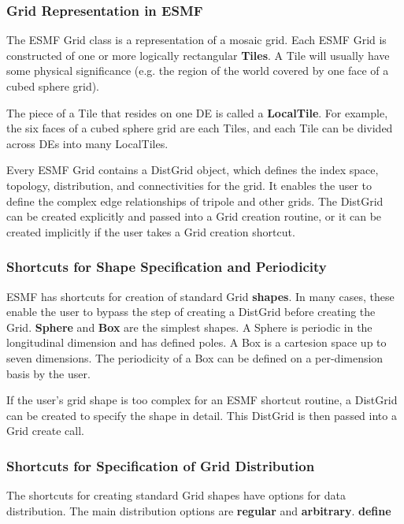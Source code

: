 \subsubsection{Grid Representation in ESMF}

The ESMF Grid class is a representation of a mosaic grid.  Each ESMF
Grid is constructed of one or more logically rectangular {\bf Tiles}.
A Tile will usually have some physical significance (e.g. the region
of the world covered by one face of a cubed sphere grid).

The piece of a Tile that resides on one DE is called a {\bf LocalTile}.
For example, the six faces of a cubed sphere grid are each Tiles, and
each Tile can be divided across DEs into many LocalTiles. 

Every ESMF Grid contains a DistGrid object, which defines the index space,
topology, distribution, and connectivities for the grid.  It enables
the user to define the complex edge relationships of tripole and other
grids.  The DistGrid can be created explicitly and passed into a Grid
creation routine, or it can be created implicitly if the user takes
a Grid creation shortcut.

\subsubsection{Shortcuts for Shape Specification and Periodicity}
\label{sec:ShapeShortcut}
ESMF has shortcuts for creation of standard Grid {\bf shapes}.  
In many cases, these enable the user to bypass the step of creating 
a DistGrid before creating the Grid.  
{\bf Sphere} and {\bf Box} are the simplest shapes.
A Sphere is periodic in the
longitudinal dimension and has defined poles.  A Box is a cartesion
space up to seven dimensions.  The periodicity of a Box can be
defined on a per-dimension basis by the user.  

If the user's grid shape is too complex for an ESMF shortcut routine,
a DistGrid can be created to specify the shape in detail. 
This DistGrid is then passed into a Grid create call.

\subsubsection{Shortcuts for Specification of Grid Distribution} 

The shortcuts for creating standard Grid shapes have options
for data distribution.  The main distribution options are 
{\bf regular} and {\bf arbitrary}.  {\bf define}

